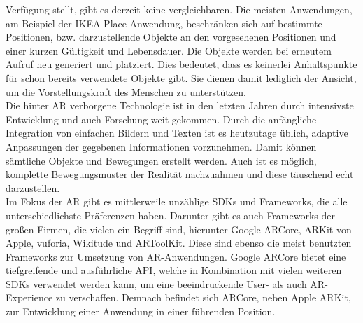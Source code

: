 Verfügung stellt, gibt es derzeit keine vergleichbaren. Die meisten Anwendungen, am Beispiel der IKEA Place Anwendung, beschränken sich 
auf bestimmte Positionen, bzw. darzustellende Objekte an den vorgesehenen Positionen und einer kurzen Gültigkeit und Lebensdauer. 
Die Objekte werden bei erneutem Aufruf neu generiert und platziert. Dies bedeutet, 
dass es keinerlei Anhaltspunkte für schon bereits verwendete Objekte gibt. Sie dienen damit lediglich der Ansicht, um die 
Vorstellungskraft des Menschen zu unterstützen. 
\\ 
\linebreak
Die hinter \acs{AR} verborgene Technologie ist in den letzten Jahren durch intensivste Entwicklung und auch Forschung weit gekommen. Durch 
die anfängliche Integration von einfachen Bildern und Texten ist es heutzutage üblich, adaptive Anpassungen der gegebenen Informationen 
vorzunehmen. \cite{standDerAR.2020} Damit können sämtliche Objekte und Bewegungen erstellt werden. Auch ist es möglich, komplette Bewegungsmuster der Realität 
nachzuahmen und diese täuschend echt darzustellen.
\\ 
\linebreak
Im Fokus der \acl{AR} gibt es mittlerweile unzählige SDKs und Frameworks, die alle unterschiedlichste Präferenzen haben. Darunter gibt es 
auch Frameworks der großen Firmen, die vielen ein Begriff sind, hierunter Google ARCore, ARKit von Apple, vuforia, Wikitude und ARToolKit. 
Diese sind ebenso die meist benutzten Frameworks zur Umsetzung von \acs{AR}-Anwendungen. Google ARCore bietet eine tiefgreifende und ausführliche 
\ac{API}, welche in Kombination mit vielen weiteren SDKs verwendet werden kann, um eine beeindruckende User- als auch \acs{AR}-Experience zu verschaffen. 
Demnach befindet sich ARCore, neben Apple ARKit, zur Entwicklung einer Anwendung in einer führenden Position. 
